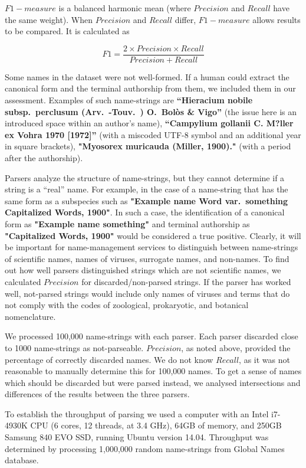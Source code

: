 \documentclass{bmcart}
\begin{document}
$F1-measure$ is a balanced harmonic mean (where $Precision$ and $Recall$ have the same weight). When $Precision$ and $Recall$ differ, $F1-measure$ allows results to be compared. It is calculated as

\[F1 = \dfrac{2 \times Precision \times Recall}{Precision + Recall}\]


Some names in the dataset were not well-formed. If a human could extract the canonical form and the terminal authorship from them, we included them in our assessment.  Examples of such name-strings are \textbf{``Hieracium nobile subsp.\ perclusum (Arv.\ -Touv.\ ) O.\ Bolòs \& Vigo''} (the issue here is an introduced space within an author's name), \textbf{``Campylium gollanii C. M?ller ex Vohra 1970 [1972]''} (with a miscoded UTF-8 symbol and an additional year in square brackets), \textbf{"Myosorex muricauda (Miller, 1900)."} (with a period after the authorship).

Parsers analyze the structure of name-strings, but they cannot determine if a string is a ``real'' name. For example, in the case of a name-string that has the same form as a subspecies such as \textbf{"Example name Word var.\ something Capitalized Words, 1900"}. In such a case, the identification of a canonical form as \textbf{"Example name something"} and terminal authorship as \textbf{"Capitalized Words, 1900"} would be considered a true positive.  Clearly, it will be important for name-management services to distinguish between name-strings of scientific names, names of viruses, surrogate names, and non-names. To find out how well parsers distinguished strings which are not scientific names, we calculated $Precision$ for discarded/non-parsed strings.  If the parser has worked well, not-parsed strings would include only names of viruses and terms that do not comply with the codes of zoological, prokaryotic, and botanical nomenclature.

We processed 100,000 name-strings with each parser. Each parser discarded close to 1000 name-strings as not-parseable. $Precision$, as noted above, provided the percentage of correctly discarded names. We do not know $Recall$, as it was not reasonable to manually determine this for 100,000 names. To get a sense of names which should be discarded but were parsed instead, we analysed intersections and differences of the results between the three parsers. 

To establish the throughput of parsing we used a computer with an Intel i7-4930K CPU (6 cores, 12 threads, at 3.4 GHz), 64GB of memory, and 250GB Samsung 840 EVO SSD, running Ubuntu version 14.04. Throughput was determined by processing 1,000,000 random name-strings from Global Names database.
\end{document}
